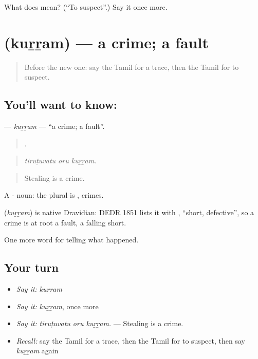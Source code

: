 \begin{tcolorbox}[breakable,colback=teal!4,colframe=teal!35!black,title={Before you move on}]
What does  mean? (\textquotedblleft{}To suspect\textquotedblright{}.) Say it once more.
\end{tcolorbox}
\section[\texorpdfstring{\ta{குற்றம்} (kuṟṟam)}{குற்றம் (kuṟṟam)}]{ (kuṟṟam) — a crime; a fault}

\label{lesson:TA-C295-kurram}



\begin{quote}
Before the new one: say the Tamil for a trace, then the Tamil for to suspect.
\end{quote}

\subsection*{You'll want to know: }
\textbf{} — \emph{kuṟṟam} — \textquotedblleft{}a crime; a fault\textquotedblright{}.

\begin{quote}
  .
\end{quote}

\begin{quote}
\emph{tiruṭuvatu oru kuṟṟam.}
\end{quote}

\begin{quote}
Stealing is a crime.
\end{quote}

A - noun: the plural is , crimes.

\begin{cousinweb}
\textbf{} (\emph{kuṟṟam}) is native Dravidian: DEDR 1851 lists it with , \textquotedblleft{}short, defective\textquotedblright{}, so a crime is at root a fault, a falling short.
\end{cousinweb}

\begin{grammarlens}[title={What you've built}]
One more word for telling what happened.
\end{grammarlens}

\subsection*{Your turn}
\begin{itemize}
\raggedright
  \item \emph{Say it:} \emph{kuṟṟam}
  \item \emph{Say it:} \emph{kuṟṟam}, once more
  \item \emph{Say it:} \emph{tiruṭuvatu oru kuṟṟam.} — Stealing is a crime.
  \item \emph{Recall:} say the Tamil for a trace, then the Tamil for to suspect, then say \emph{kuṟṟam} again
\end{itemize}

